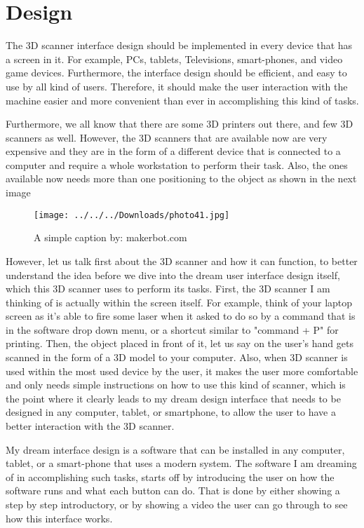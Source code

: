 \documentclass[12pt, oneside]{amsart}   	%
\begin{document}
\section{Design}
The 3D scanner interface design should be implemented in every device that has a screen in it.  For example, PCs, tablets, Televisions, smart-phones, and video game devices. Furthermore, the interface design should be efficient, and easy to use by all kind of users. Therefore, it should make the user interaction with the machine easier and more convenient than ever in accomplishing this kind of tasks. 

Furthermore, we all know that there are some 3D printers out there, and few 3D scanners as well.  However, the 3D scanners that are available now are very expensive and they are in the form of a different device that is connected to a computer and require a whole workstation to perform their task.  Also, the ones available now needs more than one positioning to the object as shown in the next image

\begin{figure}[ht!]
\centering
\texttt{[image: ../../../Downloads/photo41.jpg]}
\caption{A simple caption by: makerbot.com}
\label{overflow}
\end{figure}

However, let us talk first about the 3D scanner and how it can function, to better understand the idea before we dive into the dream user interface design itself, which this 3D scanner uses to perform its tasks.
First, the 3D scanner I am thinking of is actually within the screen itself.  For example, think of your laptop screen as it's able to fire some laser when it asked to do so by a command that is in the software drop down menu, or a shortcut similar to "command + P" for printing. Then, the object placed in front of it, let us say on the user's hand gets scanned in the form of a 3D model to your computer.  Also, when 3D scanner is used within the most used device by the user, it makes the user more comfortable and only needs simple instructions on how to use this kind of scanner, which is the point where it clearly leads to my dream design interface that needs to be designed in any computer, tablet, or smartphone, to allow the user to have a better interaction with the 3D scanner.

My dream interface design is a software that can be installed in any computer, tablet, or a smart-phone that uses a modern system.  The software I am dreaming of in accomplishing such tasks, starts off by introducing the user on how the software runs and what each button can do.  That is done by either showing a step by step introductory, or by showing a video the user can go through to see how this interface works.  
\end{document}
